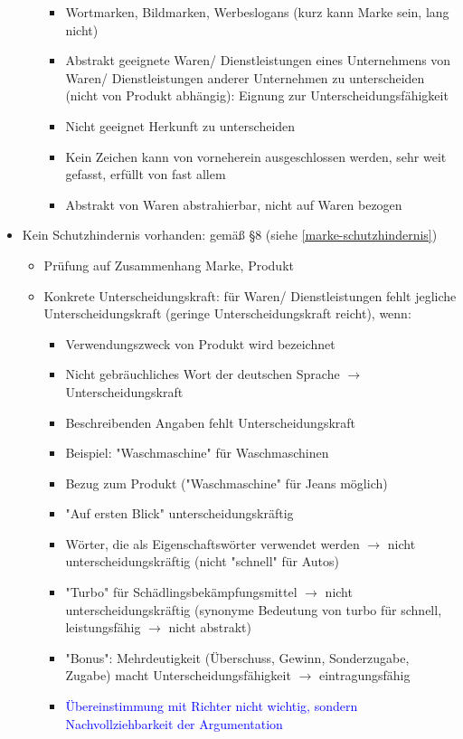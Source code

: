 \documentclass{report}
\begin{document}
\begin{itemize}
\begin{itemize}
\begin{itemize}
			\item Wortmarken, Bildmarken, Werbeslogans (kurz kann Marke sein, lang nicht)
			\item Abstrakt geeignete Waren/ Dienstleistungen eines Unternehmens von Waren/ Dienstleistungen anderer Unternehmen zu unterscheiden (nicht von Produkt abhängig): Eignung zur Unterscheidungsfähigkeit
			\item Nicht geeignet Herkunft zu unterscheiden
			\item Kein Zeichen kann von vorneherein ausgeschlossen werden, sehr weit gefasst, erfüllt von fast allem
			\item Abstrakt von Waren abstrahierbar, nicht auf Waren bezogen
		\end{itemize}
	\end{itemize}
	\item Kein Schutzhindernis vorhanden: gemäß §8 (siehe \ref{marke-schutzhindernis})
	\begin{itemize}
		\item Prüfung auf Zusammenhang Marke, Produkt
		\item Konkrete Unterscheidungskraft: für Waren/ Dienstleistungen fehlt jegliche Unterscheidungskraft (geringe Unterscheidungskraft reicht), wenn:
		\begin{itemize}
			\item Verwendungszweck von Produkt wird bezeichnet
			\item Nicht gebräuchliches Wort der deutschen Sprache $\rightarrow$ Unterscheidungskraft
			\item Beschreibenden Angaben fehlt Unterscheidungskraft
			\item Beispiel: "Waschmaschine" für Waschmaschinen
			\item Bezug zum Produkt ("Waschmaschine" für Jeans möglich)
			\item "Auf ersten Blick" unterscheidungskräftig
			\item Wörter, die als Eigenschaftswörter verwendet werden $\rightarrow$ nicht unterscheidungskräftig (nicht "schnell" für Autos)
			\item "Turbo" für Schädlingsbekämpfungsmittel $\rightarrow$ nicht unterscheidungskräftig (synonyme Bedeutung von turbo für schnell, leistungsfähig $\rightarrow$ nicht abstrakt)
			\item "Bonus": Mehrdeutigkeit (Überschuss, Gewinn, Sonderzugabe, Zugabe) macht Unterscheidungsfähigkeit $\rightarrow$ eintragungsfähig
			\item \textcolor{blue}{Übereinstimmung mit Richter nicht wichtig, sondern Nachvollziehbarkeit der Argumentation}

\end{itemize}
\end{itemize}
\end{itemize}
\end{document}
